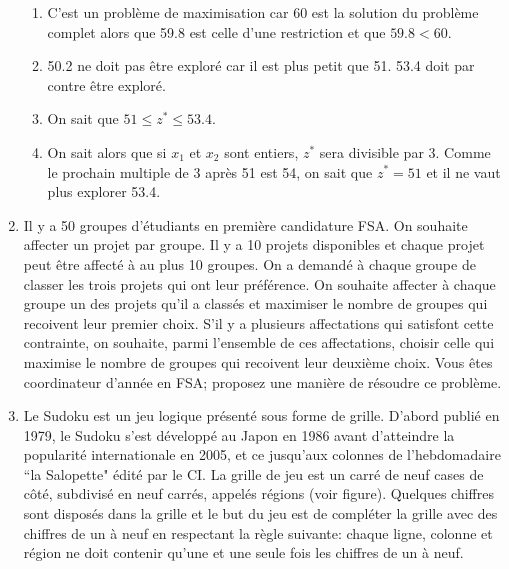 \begin{enumerate}
    \begin{solution}
      \begin{enumerate}
        \item C'est un problème de maximisation car 60 est la solution
          du problème complet alors que 59.8 est celle
          d'une restriction et que $59.8 < 60$.
        \item 50.2 ne doit pas être exploré car il est plus petit que 51.
          53.4 doit par contre être exploré.
        \item On sait que $51 \leq z^* \leq 53.4$.
        \item On sait alors que si $x_1$ et $x_2$ sont entiers,
          $z^*$ sera divisible par 3.
          Comme le prochain multiple de 3 après 51 est 54,
          on sait que $z^* = 51$ et il ne vaut plus explorer 53.4.
      \end{enumerate}
    \end{solution}

  \item  Il y a 50 groupes d'étudiants en première candidature FSA. On souhaite affecter un projet par groupe. Il y a 10
    projets disponibles et chaque projet peut être affecté à au plus 10 groupes. On a demandé à chaque groupe de classer les trois projets qui ont leur
    préférence. On souhaite affecter à chaque groupe un des projets qu'il a classés et maximiser le nombre de groupes qui recoivent leur premier choix.
    S'il y a plusieurs affectations qui satisfont cette contrainte, on souhaite, parmi l'ensemble de ces affectations, choisir celle qui maximise le nombre de groupes
    qui recoivent leur deuxième choix. Vous êtes coordinateur d'année en FSA; proposez une manière de résoudre ce problème.


    \begin{solution}
      \nosolution
    \end{solution}

  \item Le Sudoku est un jeu logique présenté sous forme de grille. D'abord publié en 1979, le Sudoku s'est développé au Japon en 1986 avant d'atteindre la popularité internationale en 2005, et ce jusqu'aux colonnes de l'hebdomadaire ``la Salopette" édité par le CI. La grille de jeu est un carré de neuf cases de côté, subdivisé en neuf carrés, appelés régions (voir figure). Quelques chiffres sont disposés dans la grille et le but du jeu est de compléter la grille avec des chiffres  de un à neuf en respectant la règle suivante: chaque ligne, colonne et région ne doit contenir qu'une et une seule fois  les chiffres de un à neuf.


\end{enumerate}
